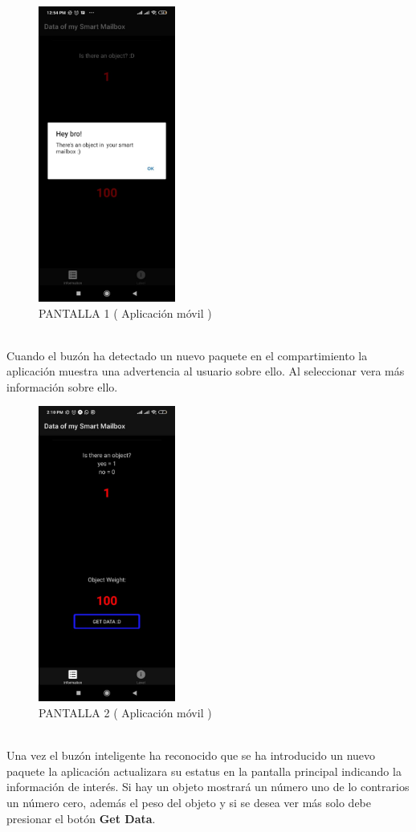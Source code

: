 \documentclass[osajnl,twocolumn,showpacs,superscriptaddress,10pt]{revtex4-1}
\begin{document}
\begin{figure} [H] \centering 
\caption{PANTALLA 1 ( Aplicación móvil )}
\includegraphics[width=0.4\textwidth]{img4.jpeg} 
\end{figure}
\\
Cuando el buzón ha detectado un nuevo paquete en el compartimiento la aplicación muestra una advertencia al usuario sobre ello. Al seleccionar vera más información sobre ello.

\begin{figure} [H] \centering 
\caption{PANTALLA 2 ( Aplicación móvil )}
\includegraphics[width=0.4\textwidth]{img2.jpeg} 
\end{figure}
\\
Una vez el buzón inteligente ha reconocido que se ha introducido un nuevo paquete la aplicación actualizara su estatus en la pantalla principal indicando la información de interés. Si hay un objeto mostrará un número uno de lo contrarios un número cero, además el peso del objeto y si se desea ver más solo debe presionar el botón \textbf{Get Data}.
\end{document}
